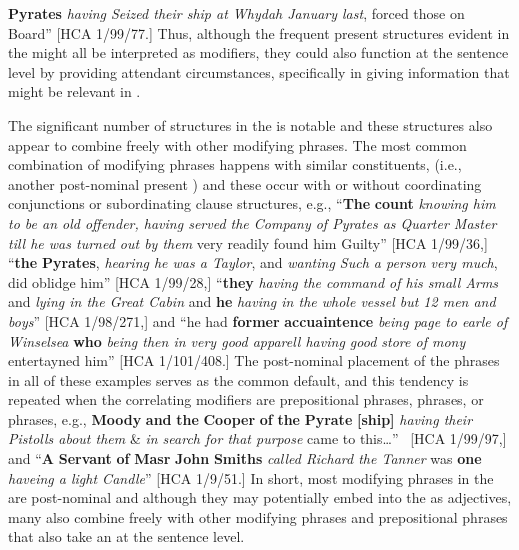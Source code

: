 \textbf{Pyrates} \textit{having Seized their ship at Whydah January last}, forced those on Board” [HCA 1/99/77.] Thus, although the frequent present  structures evident in the  might all be interpreted as  modifiers, they could also function at the sentence level by providing attendant circumstances, specifically in giving information that might be relevant in . 

The significant number of  structures in the  is notable and these structures also appear to combine freely with other modifying phrases. The most common combination of modifying phrases happens with similar constituents, (i.e., another post-nominal present ) and these occur with or without coordinating conjunctions or subordinating clause structures, e.g.,  “\textbf{The} \textbf{count} \textit{knowing him to be an old offender, having served the Company of Pyrates as Quarter Master till he was turned out by them} very readily found him Guilty” [HCA 1/99/36,] “\textbf{the} \textbf{Pyrates}, \textit{hearing he was a Taylor}, and \textit{wanting Such a person very much}, did oblidge him” [HCA 1/99/28,] “\textbf{they} \textit{having the command of his small Arms} and \textit{lying in the Great Cabin} and \textbf{he} \textit{having in the whole vessel but 12 men and boys}” [HCA 1/98/271,] and “he had \textbf{former} \textbf{accuaintence} \textit{being page to earle of Winselsea} \textbf{who} \textit{being then in very good apparell having good store of mony} entertayned him” [HCA 1/101/408.] The post-nominal placement of the  phrases in all of these examples serves as the common default, and this tendency is repeated when the correlating modifiers are prepositional phrases,  phrases, or  phrases, e.g., \textbf{Moody} \textbf{and} \textbf{the} \textbf{Cooper} \textbf{of} \textbf{the} \textbf{Pyrate} \textbf{[ship]} \textit{having their Pistolls about them} \& \textit{in search for that purpose} came to this…” ~[HCA 1/99/97,] and “\textbf{A} \textbf{Servant} \textbf{of} \textbf{Masr} \textbf{John} \textbf{Smiths} \textit{called Richard the Tanner} was \textbf{one} \textit{haveing a light Candle}” [HCA 1/9/51.] In short, most modifying  phrases in the  are post-nominal and although they may potentially embed into the  as adjectives, many also combine freely with other modifying  phrases and prepositional phrases that also take an  at the sentence level. 

